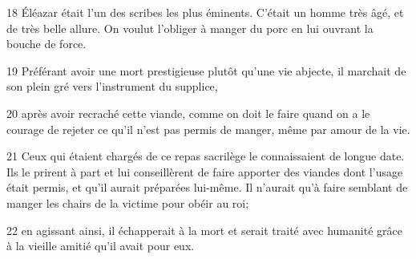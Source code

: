18 Éléazar était l’un des scribes les plus éminents. C’était un homme très âgé, et de très belle allure. On voulut l’obliger à manger du porc en lui ouvrant la bouche de force.

19 Préférant avoir une mort prestigieuse plutôt qu’une vie abjecte, il marchait de son plein gré vers l’instrument du supplice,

20 après avoir recraché cette viande, comme on doit le faire quand on a le courage de rejeter ce qu’il n’est pas permis de manger, même par amour de la vie.

21 Ceux qui étaient chargés de ce repas sacrilège le connaissaient de longue date. Ils le prirent à part et lui conseillèrent de faire apporter des viandes dont l’usage était permis, et qu’il aurait préparées lui-même. Il n’aurait qu’à faire semblant de manger les chairs de la victime pour obéir au roi;

22 en agissant ainsi, il échapperait à la mort et serait traité avec humanité grâce à la vieille amitié qu’il avait pour eux.
